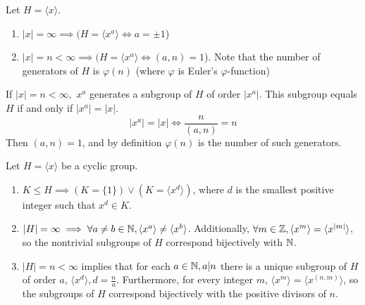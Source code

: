 \documentclass{report}
\newcommand{\thm}[2]{\begin{Theorem}{#1}{}#2\end{Theorem}}
\newcommand{\mprop}[2]{\begin{Prop}{#1}{}#2\end{Prop}}
\newenvironment{myproof}[1][\proofname]{%
	\proof[\bfseries #1: ]%
}{\endproof}
\begin{document}
\mprop{}{Let $H = \langle x \rangle$. 
\begin{enumerate}
    \item $|x| = \infty \implies (H = \langle x^a \rangle \iff a = \pm 1$)
    \item $|x| = n < \infty \implies (H = \langle x^a \rangle \iff (a, n ) = 1$). Note that the number of generators of $H$ is $\varphi (n)$ (where $\varphi$ is Euler's $\varphi$-function)
\end{enumerate}}
\begin{myproof}
    If $|x| = n < \infty,$ $x^a$ generates a subgroup of $H$ of order $|x^a|$. This subgroup equals $H$ if and only if $|x^a| = |x|$. 
    $$|x^a| = |x| \iff \frac{n}{(a,n)} = n$$
    Then $(a,n) = 1$, and by definition $\varphi (n)$ is the number of such generators.  
\end{myproof}
\thm{}{Let $H = \langle x \rangle$ be a cyclic group. 
\begin{enumerate}
    \item $K \leq H \implies (K = \{1\}) \lor (K = \langle x^d \rangle)$, where $d$ is the smallest positive integer such that $x^d \in K$.
    \item $|H| = \infty \implies \forall a \neq b \in \mathbb{N}, \langle x^a \rangle \neq \langle x^b \rangle$. Additionally, $\forall m \in \mathbb{Z} , \langle x^m \rangle = \langle x^{|m|} \rangle$, so the nontrivial subgroups of $H$ correspond bijectively with $\mathbb{N}$. 
    \item $|H | = n < \infty$ implies that for each $a \in \mathbb{N}, a | n$ there is a unique subgroup of $H$ of order $a$, $\langle x^d \rangle , d = \frac{n}{a}$. Furthermore, for every integer $m$, $\langle x^m \rangle = \langle x^{(n,m)} \rangle$, so the subgroups of $H$ correspond bijectively with the positive divisors of $n$. 
\end{enumerate}}
\end{document}
